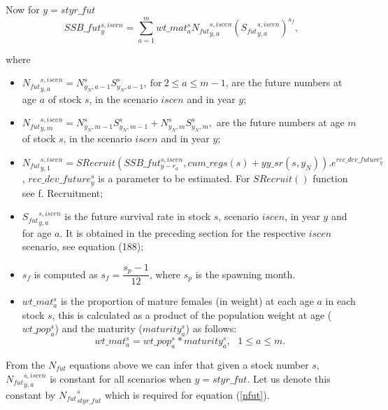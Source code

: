 \documentclass{article}
\begin{document}
Now for $y=styr\_fut$ 
\begin{equation}
    SSB\_fut^{s,iscen}_{y}= \sum_{a=1}^mwt\_{mat}^s_a {N_{fut}}^{s,iscen}_{y,a} ({{S_{fut}}^{s,iscen}_{y,a}})^{s_f},
\end{equation}

where 

\begin{itemize}

    \item ${N_{fut}}^{s,iscen}_{y,a}=N^s_{y_N,a-1} S^s_{y_N,a-1}, \ \text{for}\ 2\leq a \leq m-1$, are the future numbers at age $a$ of stock $s$, in the scenario $iscen$ and in year $y$;

    \item ${N_{fut}}^{s,iscen}_{y,m}=N^s_{y_N,m-1}S^s_{y_N,m-1}+N^s_{y_N,m}S^s_{y_N,m},$ are the future numbers at age $m$ of stock $s$, in the scenario $iscen$ and in year $y$;

    \item ${N_{fut}}^{s,iscen}_{y,1}=SRecruit( SSB\_fut^{s,iscen}_{y-r_a},cum\_regs(s)+yy\_sr(s,y_N) ). e^{rec\_dev\_future^s_y}$, $rec\_dev\_future^s_y$ is a parameter to be estimated. For $SRecruit()$ function  see f. Recruitment;
    \item ${{S_{fut}}^{s,iscen}_{y,a}}$ is the future survival rate in stock $s$, scenario $iscen$, in year $y$ and for age $a$. It is obtained in the preceding section for the respective $iscen$ scenario, see equation (188);
    \item $s_f$ is computed as $s_f=\dfrac{s_p-1}{12}$, where $s_p$ is the spawning month.
    \item $wt\_{mat}^s_a$ is the proportion of mature females (in weight) at each age $a$ in each stock $s$, this is calculated as a product of the population weight at age ($wt\_pop^s_a$) and the maturity ($maturity^s_a$) as follows:
    \begin{equation*}
        wt\_{mat}^s_a=wt\_pop^s_a *maturity^s_a, \ \ \ 1\leq a \leq m. 
    \end{equation*}
        
\end{itemize}
From the $N_{fut}$ equations above we can infer that given a stock number $s$, ${N_{fut}}^{s,iscen}_{y,a}$ is constant for all scenarios when $y=styr\_fut$. Let us denote this constant by ${N_{fut}}_{{styr\_fut}}^{s}$ which is required for equation (\ref{nfut}).
\end{document}
